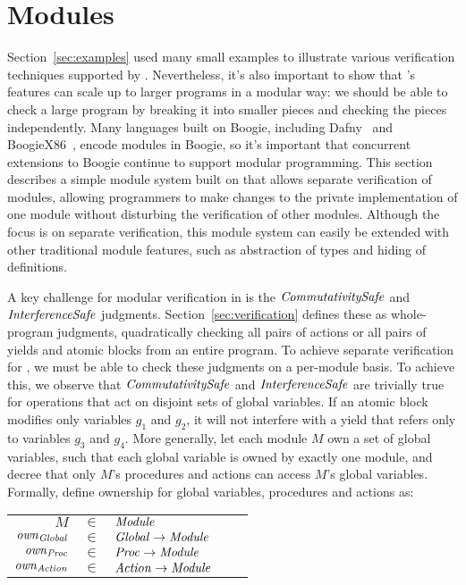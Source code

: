 \section{Modules}
\label{sec:modules}

Section~\ref{sec:examples} used many small examples to illustrate various verification techniques supported by \civl.
Nevertheless, it's also important to show that \civl's features can scale up to larger programs in a modular way:
we should be able to check a large program by breaking it into smaller pieces and checking the pieces independently.
Many languages built on Boogie, including Dafny~\cite{Dafny10} and BoogieX86~\cite{IronClad14}, encode modules in Boogie,
so it's important that concurrent extensions to Boogie continue to support modular programming.
This section describes a simple module system built on \civl that allows separate verification of modules,
allowing programmers to make changes to the private implementation of one module
without disturbing the verification of other modules.
Although the focus is on separate verification,
this module system can easily be extended with other traditional module features,
such as abstraction of types and hiding of definitions.

A key challenge for modular verification in \civl is the $\mathit{CommutativitySafe}$ and $\mathit{InterferenceSafe}$ judgments.
Section~\ref{sec:verification} defines these as whole-program judgments,
quadratically checking all pairs of actions or all pairs of yields and atomic blocks from an entire program.
To achieve separate verification for \civl,
we must be able to check these judgments on a per-module basis.
To achieve this,
we observe that $\mathit{CommutativitySafe}$ and $\mathit{InterferenceSafe}$ are trivially true for operations that act on disjoint sets of global variables.
If an atomic block modifies only variables $g_1$ and $g_2$, it will not interfere with a yield that refers only to variables $g_3$ and $g_4$.
More generally, let each module $M$ own a set of global variables, such that each global variable is owned by exactly one module,
and decree that only $M$'s procedures and actions can access $M$'s global variables.
Formally, define ownership for global variables, procedures and actions as:

\hspace{10mm}\begin{tabular}{rclcl}
$M$ & $\in$ & $\mathit{Module}$ \\
$\mathit{own}_{\mathit{Global}}$ & $\in$ & $\mathit{Global} \rightarrow \mathit{Module}$ \\
$\mathit{own}_{\mathit{Proc}}$ & $\in$ & $\mathit{Proc} \rightarrow \mathit{Module}$ \\
$\mathit{own}_{\mathit{Action}}$ & $\in$ & $\mathit{Action} \rightarrow \mathit{Module}$ \\
\end{tabular}

